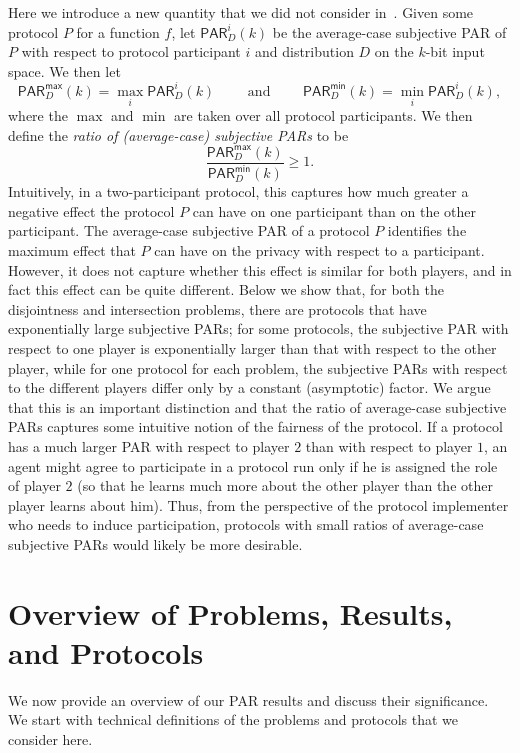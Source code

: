 \documentclass{article}
\theoremstyle{theorem}
\theoremstyle{definition}
\theoremstyle{remark}
\newcommand{\paratio}{\ensuremath{\mathsf{PAR}}}
\begin{document}
Here we introduce a new quantity that we did not consider in~\cite{fjs09tr14}.  Given some protocol $P$ for a function $f$, let $\paratio^i_D(k)$ be the average-case subjective PAR of $P$ with respect to protocol participant $i$ and distribution $D$ on the $k$-bit input space.  We then let
\[
\paratio^\mathsf{max}_D(k) = \max_i\paratio^i_D(k) \qquad\text{ and }\qquad\paratio^\mathsf{min}_D(k) = \min_i\paratio^i_D(k),
\]
where the $\max$ and $\min$ are taken over all protocol participants.  We then define the \emph{ratio of (average-case) subjective PARs} to be
\[
\frac{\paratio^\mathsf{max}_D(k)}{\paratio^\mathsf{min}_D(k)}\geq 1.
\]
Intuitively, in a two-participant protocol, this captures how much greater a negative effect the protocol $P$ can have on one participant than on the other participant. The average-case subjective PAR of a protocol $P$ identifies the maximum effect that $P$ can have on the privacy with respect to a participant.  However, it does not capture whether this effect is similar for both players, and in fact this effect can be quite different.  Below we show that, for both the disjointness and intersection problems, there are protocols that have exponentially large subjective PARs; for some protocols, the subjective PAR with respect to one player is exponentially larger than that with respect to the other player, while for one protocol for each problem, the subjective PARs with respect to the different players differ only by a constant (asymptotic) factor.  We argue that this is an important distinction and that the ratio of average-case subjective PARs captures some intuitive notion of the fairness of the protocol.  If a protocol has a much larger PAR with respect to player $2$ than with respect to player $1$, an agent might agree to participate in a protocol run only if he is assigned the role of player $2$ (so that he learns much more about the other player than the other player learns about him).  Thus, from the perspective of the protocol implementer who needs to induce participation, protocols with small ratios of average-case subjective PARs would likely be more desirable.



\section{Overview of Problems, Results, and Protocols}\label{sec:overview}

We now provide an overview of our PAR results and discuss their significance.  We start with technical definitions of the problems and protocols that we consider here.
\end{document}
